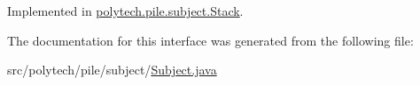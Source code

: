 Implemented in \hyperlink{classpolytech_1_1pile_1_1subject_1_1_stack_a350f674a71cae9fce7eca5488af074e5}{polytech.\+pile.\+subject.\+Stack}.



The documentation for this interface was generated from the following file\+:\begin{DoxyCompactItemize}
\item 
src/polytech/pile/subject/\hyperlink{_subject_8java}{Subject.\+java}\end{DoxyCompactItemize}
